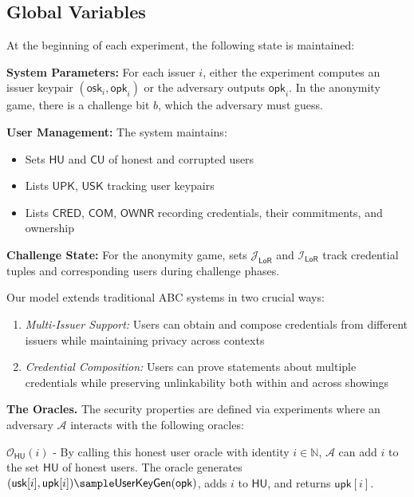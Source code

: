 \subsection{Global Variables}
At the beginning of each experiment, the following state is maintained:

\noindent \textbf{System Parameters:} For each issuer $i$, either the experiment computes an issuer keypair $(\mathsf{osk}_i, \mathsf{opk}_i)$ or the adversary outputs $\mathsf{opk}_i$. In the anonymity game, there is a challenge bit $b$, which the adversary must guess.

\noindent \textbf{User Management:} The system maintains:
\begin{itemize}
\item Sets $\mathsf{HU}$ and $\mathsf{CU}$ of honest and corrupted users
\item Lists $\mathsf{UPK}$, $\mathsf{USK}$ tracking user keypairs
\item Lists $\mathsf{CRED}$, $\mathsf{COM}$, $\mathsf{OWNR}$ recording credentials, their commitments, and ownership
\end{itemize}

\noindent \textbf{Challenge State:} For the anonymity game, sets $\mathcal{J}_{\mathsf{LoR}}$ and $\mathcal{I}_{\mathsf{LoR}}$ track credential tuples and corresponding users during challenge phases.

\noindent  Our model extends traditional ABC systems in two crucial ways:
\begin{enumerate}
    \item \textit{Multi-Issuer Support:} Users can obtain and compose credentials from different issuers while maintaining privacy across contexts
    \item \textit{Credential Composition:} Users can prove statements about multiple credentials while preserving unlinkability both within and across showings
\end{enumerate}

\noindent  \textbf{The Oracles.} The security properties are defined via experiments where an adversary $\mathcal{A}$ interacts with the following oracles:

\noindent $\mathcal{O}_{\mathsf{HU}}(i)$ - By calling this honest user oracle with identity $i \in \mathbb{N}$, $\mathcal{A}$ can add $i$ to the set $\mathsf{HU}$ of honest users. The oracle generates $(\mathsf{usk}[i], \mathsf{upk}[i]) \sample \mathsf{UserKeyGen}(\mathsf{opk})$, adds $i$ to $\mathsf{HU}$, and returns $\mathsf{upk}[i]$.

